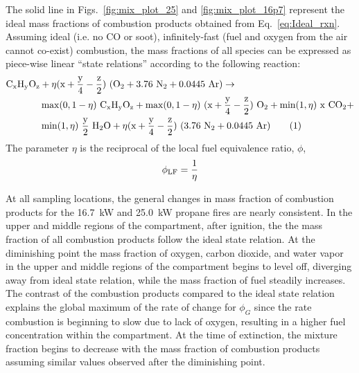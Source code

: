 \documentclass[12pt,letterpaper]{article}
\newcommand\numberthis{\addtocounter{equation}{1}\tag{\theequation}}
\begin{document}
\begin{flushleft}
The solid line in Figs.~\ref{fig:mix_plot_25} and \ref{fig:mix_plot_16p7} represent the ideal mass fractions of combustion products obtained from Eq.~\ref{eq:Ideal_rxn}. Assuming ideal (i.e. no CO or soot), infinitely-fast (fuel and oxygen from the air cannot co-exist) combustion, the mass fractions of all species can be expressed as piece-wise linear ``state relations'' according to the following reaction:
\begin{align*}
{\rm C}_{\rm x}{\rm H}_{\rm y}{\rm O}_{\rm z} & +\eta(\rm x+\frac{\rm y}{4}-\frac{\rm z}{2})~({\rm O}_{2}+3.76~{\rm N}_{2}+0.0445~{\rm Ar}) \rightarrow  \\
          & \max(0,1-\eta)~{\rm C}_{\rm x}{\rm H}_{\rm y}{\rm O}_{\rm z}+\max(0,1-\eta)~(\rm x+\frac{\rm y}{4}-\frac{\rm z}{2})~{\rm O}_{2}+ \min(1,\eta)~\rm x~{\rm CO}_{2} +  \\
          & \min(1,\eta)~\frac{\rm y}{2}~{\rm H}_{2}{\rm O}+\eta(\rm x+\frac{\rm y}{4}-\frac{\rm z}{2})~(3.76~{\rm N}_{2}+0.0445~{\rm Ar})  \numberthis \label{eq:Ideal_rxn}
\end{align*}
The parameter $\eta$ is the reciprocal of the local fuel equivalence ratio, $\phi$,
\begin{equation}\label{eq:Eta}
\phi_{\rm{LF}}=\frac{1}{\eta}
\end{equation}  

At all sampling locations, the general changes in mass fraction of combustion products for the 16.7~kW and 25.0~kW propane fires are nearly consistent. In the upper and middle regions of the compartment, after ignition, the the mass fraction of all combustion products follow the ideal state relation. At the diminishing point the mass fraction of oxygen, carbon dioxide, and water vapor in the upper and middle regions of the compartment begins to level off, diverging away from ideal state relation, while the mass fraction of fuel steadily increases. The contrast of the combustion products compared to the ideal state relation explains the global maximum of the rate of change for $\phi_{G}$ since the rate combustion is beginning to slow due to lack of oxygen, resulting in a higher fuel concentration within the compartment. At the time of extinction, the mixture fraction begins to decrease with the mass fraction of combustion products assuming similar values observed after the diminishing point.   


\end{flushleft}
\end{document}
